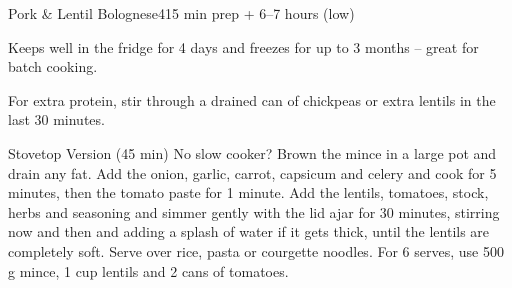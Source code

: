 \begin{recipebox}{Pork \& Lentil Bolognese}{4}{15 min prep + 6--7 hours (low)}
\begin{notes}
Keeps well in the fridge for 4 days and freezes for up to 3 months -- great for batch cooking.

For extra protein, stir through a drained can of chickpeas or extra lentils in the last 30 minutes.

\end{notes}

\begin{variationbox}{Stovetop Version (45 min)}
No slow cooker? Brown the mince in a large pot and drain any fat. Add the onion,
garlic, carrot, capsicum and celery and cook for 5 minutes, then the tomato
paste for 1 minute. Add the lentils, tomatoes, stock, herbs and seasoning and
simmer gently with the lid ajar for 30 minutes, stirring now and then and
adding a splash of water if it gets thick, until the lentils are completely
soft. Serve over rice, pasta or courgette noodles. For 6 serves, use 500\,g
mince, 1 cup lentils and 2 cans of tomatoes.
\end{variationbox}

\end{recipebox}